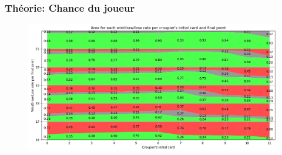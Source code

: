 \documentclass{beamer}
\begin{document}
\begin{frame}
    \frametitle{Théorie: Chance du joueur}
    \begin{figure}[H]
        \begin{center}
            \includegraphics[width=1\textwidth]{theoretical_graph1}
        \end{center}
    \end{figure}
\end{frame}
\end{document}
